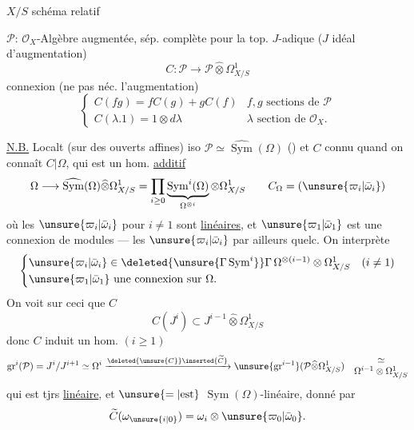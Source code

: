 $X/S$ schéma relatif

$\mathcal P$: $\mathcal O_X$-Algèbre augmentée, sép. complète pour la top. $J$-adique ($J$ idéal d'augmentation)
\[
C:\mathcal P\longrightarrow\mathcal P\widehat\otimes\Omega^1_{X/S}
\]
connexion  (ne  pas néc. l'augmentation)
\[
\begin{cases}
C(fg)=fC(g)+gC(f)& f,g\text{ sections de }\mathcal P\\
C(\lambda.1)=1\otimes d\lambda&\lambda\text{ section de }\mathcal O_X.
\end{cases}
\]

\uline{N.B.} Localt (sur des ouverts affines) 
 iso $\mathcal P\simeq\widehat{\operatorname{Sym}}(\Omega)$ () et $C$ connu quand on connaît
$C|\Omega$, qui est un hom. \uline{additif}
\[
\Omega\longrightarrow\widehat{\operatorname{Sym}}(\Omega)\widehat\otimes\Omega^1_{X/S}
=\prod_{i\geq0}\underbrace{\operatorname{Sym}^i(\Omega)}_{\Omega^{\otimes i}}\otimes\Omega^1_{X/S}
\qquad C_\Omega=(\unsure{\varpi_i|\bar\omega_i})
\]
où les $\unsure{\varpi_i|\bar\omega_i}$ pour $i\neq1$ sont \uline{linéaires}, et
$\unsure{\varpi_1|\bar\omega_1}$ est une connexion de modules --- les $\unsure{\varpi_i|\bar\omega_i}$ par ailleurs quelc. On interprète
\[
\begin{cases}
\unsure{\varpi_i|\bar\omega_i}\in\deleted{\unsure{\Gamma\operatorname{Sym}^i}}\Gamma\,\Omega^{\otimes(i-1)}\otimes\Omega^1_{X/S}&(i\neq1)\\
\unsure{\varpi_1|\bar\omega_1}\text{ une connexion sur }\Omega.
\end{cases}
\]
On voit sur ceci que $C$ 
\[C(J^i)\subset J^{i-1}\widehat\otimes\Omega^1_{X/S}\]
donc $C$ induit un hom. $(i\geq1)$
\[
\operatorname{gr}^i(\mathcal P)=J^i/J^{i+1}\simeq\Omega^i
\xrightarrow{\deleted{\unsure{C}}\inserted{\widetilde C}}
\unsure{\operatorname{gr}^{i-1}}(\mathcal P\widehat\otimes\Omega^1_{X/S})
\quad\begin{matrix}\simeq\\\Omega^{i-1}\otimes\Omega^1_{X/S}\end{matrix}
\]
qui est tjrs \uline{linéaire}, et $\unsure{=|\text{est}}$
$\operatorname{Sym}(\Omega)$-linéaire, donné par
\[\widetilde C(\omega_{\unsure{i|0}})=\omega_i\otimes\unsure{\varpi_0|\bar\omega_0}.\]
